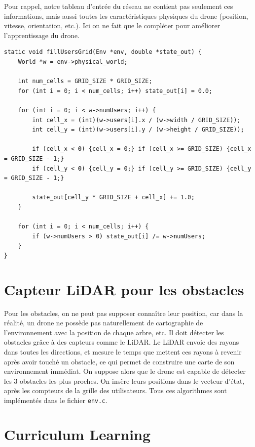 \documentclass{article}
\begin{document}
Pour rappel, notre tableau d'entrée du réseau ne contient pas seulement ces informations, mais aussi toutes
les caractéristiques physiques du drone (position, vitesse, orientation, etc.). Ici on ne fait que le compléter
pour améliorer l'apprentissage du drone.



\begin{lstlisting}[style=CStyle]
static void fillUsersGrid(Env *env, double *state_out) {
    World *w = env->physical_world;

    int num_cells = GRID_SIZE * GRID_SIZE;
    for (int i = 0; i < num_cells; i++) state_out[i] = 0.0;

    for (int i = 0; i < w->numUsers; i++) {
        int cell_x = (int)(w->users[i].x / (w->width / GRID_SIZE));
        int cell_y = (int)(w->users[i].y / (w->height / GRID_SIZE));

        if (cell_x < 0) {cell_x = 0;} if (cell_x >= GRID_SIZE) {cell_x = GRID_SIZE - 1;}
        if (cell_y < 0) {cell_y = 0;} if (cell_y >= GRID_SIZE) {cell_y = GRID_SIZE - 1;}

        state_out[cell_y * GRID_SIZE + cell_x] += 1.0;
    }

    for (int i = 0; i < num_cells; i++) {
        if (w->numUsers > 0) state_out[i] /= w->numUsers;
    }
}
\end{lstlisting}

\section{Capteur LiDAR pour les obstacles}

Pour les obstacles, on ne peut pas supposer connaître leur position, car dans la réalité, 
un drone ne possède pas naturellement de cartographie de l'environnement avec la position de chaque arbre, etc. 
Il doit détecter les obstacles grâce à des capteurs comme le LiDAR.
Le LiDAR envoie des rayons dans toutes les directions, et mesure le temps que mettent ces rayons à revenir après avoir touché un obstacle, 
ce qui permet de construire une carte de son environnement immédiat.
On suppose alors que le drone est capable de détecter les $3$ obstacles les plus proches.
On insère leurs positions dans le vecteur d'état, après les compteurs de la grille des utilisateurs.
Tous ces algorithmes sont implémentés dans le fichier \texttt{env.c}.

\section{Curriculum Learning}
\end{document}
